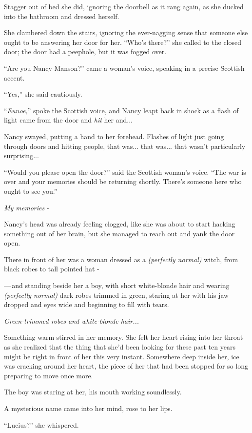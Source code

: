 Stagger out of bed she did, ignoring the doorbell as it rang again, as she ducked into the bathroom and dressed herself.

She clambered down the stairs, ignoring the ever-nagging sense that someone else ought to be answering her door for her. ``Who's there?'' she called to the closed door; the door had a peephole, but it was fogged over.

``Are you Nancy Manson?'' came a woman's voice, speaking in a precise Scottish accent.

``Yes,'' she said cautiously.

``\emph{Eunoe,}'' spoke the Scottish voice, and Nancy leapt back in shock as a flash of light came from the door and \emph{hit} her and...

Nancy swayed, putting a hand to her forehead. Flashes of light just going through doors and hitting people, that was... that was... that wasn't particularly surprising...

``Would you please open the door?'' said the Scottish woman's voice. ``The war is over and your memories should be returning shortly. There's someone here who ought to see you.''

\emph{My memories} -

Nancy's head was already feeling clogged, like she was about to start hacking something out of her brain, but she managed to reach out and yank the door open.

There in front of her was a woman dressed as a \emph{(perfectly normal)} witch, from black robes to tall pointed hat -

---\,and standing beside her a boy, with short white-blonde hair and wearing \emph{(perfectly normal)} dark robes trimmed in green, staring at her with his jaw dropped and eyes wide and beginning to fill with tears.

\emph{Green-trimmed robes and white-blonde hair...}

Something warm stirred in her memory. She felt her heart rising into her throat as she realized that the thing that she'd been looking for these past ten years might be right in front of her this very instant. Somewhere deep inside her, ice was cracking around her heart, the piece of her that had been stopped for so long preparing to move once more.

The boy was staring at her, his mouth working soundlessly.

A mysterious name came into her mind, rose to her lips.

``Lucius?'' she whispered.
